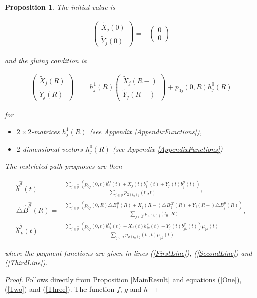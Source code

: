 \documentclass{article}
\newcommand{\1}[1]{\mathbbm{1}_{\left\lbrace #1 \right\rbrace}}
\theoremstyle{break}
\newtheorem{proposition}[definition]{Proposition}%
\theoremstyle{remark}
\numberwithin{equation}{section}
\begin{document}
\begin{proposition}
The initial value is

\begin{align*}
\begin{pmatrix}\tilde{X}_j(0) \\ \tilde{Y}_j(0)\end{pmatrix} =& \begin{pmatrix}0 \\ 0\end{pmatrix}
\end{align*}

and the gluing condition is

\begin{align*}
\begin{pmatrix}\tilde{X}_j(R) \\ \tilde{Y}_j(R)\end{pmatrix} =& h_j^1(R) \begin{pmatrix}\tilde{X}_j(R-) \\ \tilde{Y}_j(R-)\end{pmatrix} + p_{0j}(0,R) h_j^0(R)
\end{align*}

for

\begin{itemize}
	\item $2 \times 2$-matrices $h_j^1(R)$ (see Appendix \ref{AppendixFunctions}),
	\item $2$-dimensional vectors $h_j^0(R)$ (see Appendix \ref{AppendixFunctions})
\end{itemize}

The restricted path prognoses are then

\begin{align*}
	\hat{b}^{\hat{\mathcal{J}}}(t) =& \frac{\sum_{j \in \hat{\mathcal{J}}} \left( p_{0j}(0,t) b_j^\Theta(t) + \tilde{X}_j(t) b_j^\mathcal{X}(t) + \tilde{Y}_j(t) b_j^\mathcal{Y}(t)\right)}{\sum_{j \in \hat{\mathcal{J}}} p_{Z(t_0)j}(t_0,t)}, \\
	\triangle \hat{B}^{\hat{\mathcal{J}}}(R) =& \frac{\sum_{j \in \hat{\mathcal{J}}} \left(p_{0j}(0,R) \triangle B_j^\Theta(R) + \tilde{X}_j(R-) \triangle B_j^\mathcal{X}(R) + \tilde{Y}_j(R-) \triangle B_j^\mathcal{Y}(R)\right)}{\sum_{j \in \hat{\mathcal{J}}} p_{Z(t_0)j}(t_0,R)}, \\
	\hat{b}_{\cdot k}^{\hat{\mathcal{J}}}(t) =& \frac{\sum_{j \in \hat{\mathcal{J}}} \left(p_{0j}(0,t) b_{jk}^\Theta(t) + \tilde{X}_j(t) b_{jk}^\mathcal{X}(t) + \tilde{Y}_j(t) b_{jk}^\mathcal{Y}(t)\right) \mu_{jk}(t)}{\sum_{j \in \hat{\mathcal{J}}} p_{Z(t_0)j}(t_0,t) \mu_{jk}(t)}
\end{align*}

where the payment functions are given in lines (\ref{FirstLine}), (\ref{SecondLine}) and (\ref{ThirdLine}).
\end{proposition}
\begin{proof}
	Follows directly from Proposition \ref{MainResult} and equations (\ref{One}), (\ref{Two}) and (\ref{Three}). The function $f$, $g$ and $h$ 
\end{proof}
\end{document}
